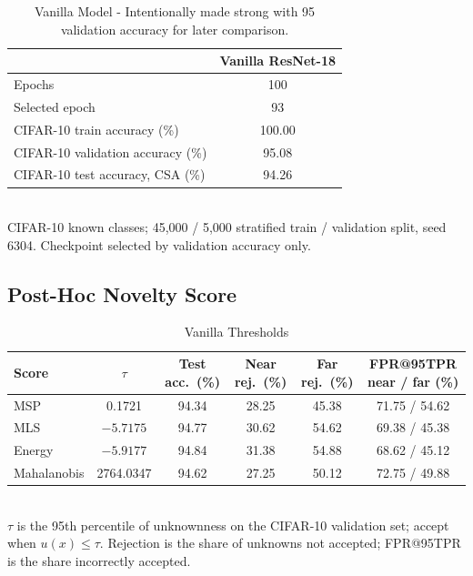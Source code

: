 \documentclass{article}
\begin{document}
\begin{table}[H]
  \caption{Vanilla Model - Intentionally made strong with 95 validation accuracy for later  comparison.}
  \label{tab:vanilla-baseline}
  \centering
  \begin{tabular}{lc}
    \toprule
    & Vanilla ResNet-18 \\
    \midrule
    Epochs                               & 100 \\
    Selected epoch                       & 93 \\
    CIFAR-10 train accuracy (\%)         & 100.00 \\
    CIFAR-10 validation accuracy (\%)    & 95.08 \\
    CIFAR-10 test accuracy, CSA (\%)     & 94.26 \\
    \bottomrule
  \end{tabular}
  \\[2pt]
  \footnotesize CIFAR-10 known classes; 45{,}000 / 5{,}000 stratified train / validation split, seed
  6304. Checkpoint selected by validation accuracy only.
\end{table}

\subsection{Post-Hoc Novelty Score}

\begin{table}[H]
  \caption{Vanilla Thresholds}
  \label{tab:vanilla-threshold}
  \centering
  \footnotesize
  \begin{tabular}{lccccc}
    \toprule
    Score & $\tau$ & Test acc.\ (\%) & Near rej.\ (\%) & Far rej.\ (\%) & FPR@95TPR near / far (\%) \\
    \midrule
    MSP         &     0.1721 & 94.34 & 28.25 & 45.38 & 71.75 / 54.62 \\
    MLS         &  $-5.7175$ & 94.77 & 30.62 & 54.62 & 69.38 / 45.38 \\
    Energy      &  $-5.9177$ & 94.84 & 31.38 & 54.88 & 68.62 / 45.12 \\
    Mahalanobis & 2764.0347  & 94.62 & 27.25 & 50.12 & 72.75 / 49.88 \\
    \bottomrule
  \end{tabular}
  \\[2pt]
  \footnotesize $\tau$ is the 95th percentile of unknownness on the CIFAR-10 validation set; accept
  when $u(x)\le\tau$. Rejection is the share of unknowns not accepted; FPR@95TPR is the share
  incorrectly accepted.
\end{table}
\end{document}
